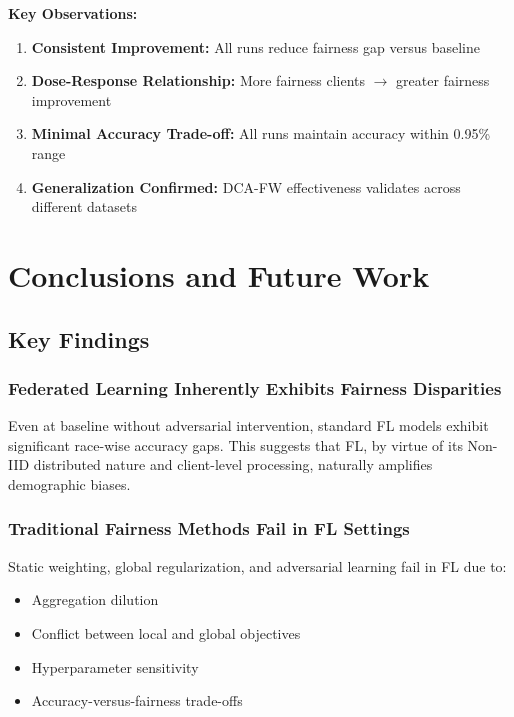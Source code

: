 \documentclass[11pt,a4paper]{report}
\begin{document}
\textbf{Key Observations:}

\begin{enumerate}
    \item \textbf{Consistent Improvement:} All runs reduce fairness gap versus baseline
    \item \textbf{Dose-Response Relationship:} More fairness clients $\rightarrow$ greater fairness improvement
    \item \textbf{Minimal Accuracy Trade-off:} All runs maintain accuracy within 0.95\% range
    \item \textbf{Generalization Confirmed:} DCA-FW effectiveness validates across different datasets
\end{enumerate}

\chapter{Conclusions and Future Work}

\section{Key Findings}

\subsection{Federated Learning Inherently Exhibits Fairness Disparities}

Even at baseline without adversarial intervention, standard FL models exhibit significant race-wise accuracy gaps. This suggests that FL, by virtue of its Non-IID distributed nature and client-level processing, naturally amplifies demographic biases.

\subsection{Traditional Fairness Methods Fail in FL Settings}

Static weighting, global regularization, and adversarial learning fail in FL due to:
\begin{itemize}
    \item Aggregation dilution
    \item Conflict between local and global objectives
    \item Hyperparameter sensitivity
    \item Accuracy-versus-fairness trade-offs
\end{itemize}
\end{document}
